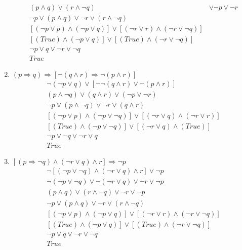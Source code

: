 \documentclass[11pt]{scrartcl}
\begin{document}
\begin{enumerate}[label=\alph*.]
{\begin{align*}
			(p \land q) \lor (r \land \lnot q) & \lor \lnot p \lor \lnot r \tag{De Morgan's Law}\\
			\lnot p \lor (p \land q) \lor \lnot r \lor (r \land \lnot q) \tag{Commutative}\\
			[(\lnot p \lor p) \land (\lnot p \lor q)] \lor [(\lnot r \lor r) \land (\lnot r \lor \lnot q)] \tag{Distributive}\\
			[(True) \land (\lnot p \lor q)] \lor [(True) \land (\lnot r \lor \lnot q)] \tag{Excluded middle}\\
			\lnot p \lor q \lor \lnot r \lor \lnot q \tag{Excluded middle}\\
			True 
		\end{align*}
		}
	\item{
		$(p \Rightarrow q) \Rightarrow [\lnot(q \land r) \Rightarrow \lnot(p \land r)]$	
		\begin{align*}
			\lnot(\lnot p \lor q) \lor [\lnot \lnot(q \land r) \lor \lnot(p \land r)] \tag{De Morgan's Law}\\
			(p \land \lnot q) \lor (q \land r) \lor (\lnot p \lor \lnot r) \tag{De Morgan's Law + Negation}\\
			\lnot p \lor (p \land \lnot q) \lor \lnot r \lor (q \land r) \tag{Commutative}\\
			[(\lnot p \lor p) \land (\lnot p \lor \lnot q)] \lor [(\lnot r \lor q) \land (\lnot r \lor r)] \tag{Distributive}\\
			[(True) \land (\lnot p \lor \lnot q)] \lor [(\lnot r \lor q) \land (True)] \tag{Excluded middle}\\
			\lnot p \lor \lnot q \lor \lnot r \lor q \tag{Excluded middle}\\
			True
		\end{align*}
		}
	\item{
		$[(p \Rightarrow \lnot q) \land (\lnot r \lor q) \land r] \Rightarrow \lnot p$
		\begin{align*}
			\lnot [(\lnot p \lor \lnot q) \land (\lnot r \lor q) \land r] \lor \lnot p \tag{Material Implication}\\
			\lnot (\lnot p \lor \lnot q) \lor \lnot (\lnot r \lor q) \lor \lnot r \lor \lnot p \tag{De Morgan's Law}\\
			(p \land q) \lor (r \land \lnot q) \lor \lnot r \lor \lnot p \tag{De Morgan's Law}\\
			\lnot p \lor (p \land q) \lor \lnot r \lor (r \land \lnot q)  \tag{Commutative}\\
			[(\lnot p \lor p) \land (\lnot p \lor q)] \lor [(\lnot r \lor r) \land (\lnot r \lor \lnot q)] \tag{Distributive}\\
			[(True) \land (\lnot p \lor q)] \lor [(True) \land (\lnot r \lor \lnot q)] \tag{Excluded middle}\\
			\lnot p \lor q \lor \lnot r \lor \lnot q \tag{Excluded middle} \\
			True \tag{Excluded middle} \\
		\end{align*}
		}
	\end{enumerate}
\end{document}
